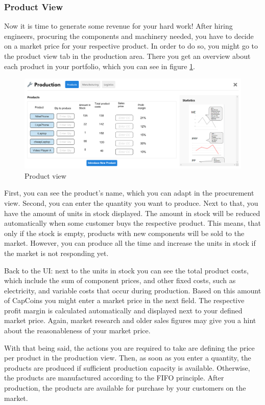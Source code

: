 \subsubsection{Product View}
\label{sub:ProductView}
Now it is time to generate some revenue for your hard work! After hiring engineers, procuring the components and machinery needed, you have to decide on a market price for your respective product. In order to do so, you might go to the product view tab in the production area. There you get an overview about each product in your portfolio, which you can see in figure \ref{fig:productView}.

\begin{figure} [h]
    \centering
    \includegraphics[width=\textwidth]{images/productView2.png}
    \caption{Product view}
    \label{fig:productView}
\end{figure}

First, you can see the product’s name, which you can adapt in the procurement view. Second, you can enter the quantity you want to produce. Next to that, you have the amount of units in stock displayed. The amount in stock will be reduced automatically when some customer buys the respective product. This means, that only if the stock is empty, products with new components will be sold to the market. However, you can produce all the time and increase the units in stock if the market is not responding yet. 

Back to the UI: next to the units in stock you can see the total product costs, which include the sum of component prices, and other fixed costs, such as electricity, and variable costs that occur during production. Based on this amount of CapCoins you might enter a market price in the next field. The respective profit margin is calculated automatically and displayed next to your defined market price. Again, market research and older sales figures may give you a hint about the reasonableness of your market price. 

With that being said, the actions you are required to take are defining the price per product in the production view. Then, as soon as you enter a quantity, the products are produced if sufficient production capacity is available. Otherwise, the products are manufactured according to the FIFO principle. After production, the products are available for purchase by your customers on the market.

